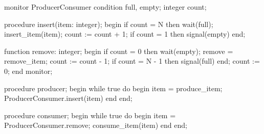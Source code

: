 \documentclass[varwidth=42em,crop]{standalone}
\begin{document}
\begin{minipage}[t]{.48\linewidth}
\begin{pascalcode}
monitor ProducerConsumer
  condition full, empty;
  integer count;

  procedure insert(item: integer);
  begin
    if count = N then wait(full);
    insert_item(item);
    count := count + 1;
    if count = 1 then signal(empty)
  end;
      
  function remove: integer;
  begin
    if count = 0 then wait(empty);
    remove = remove_item;
    count := count - 1;
    if count = N - 1 then signal(full)
  end;
  count := 0;
end monitor;  
\end{pascalcode}
\end{minipage}\qquad\quad
\begin{minipage}[t]{.48\linewidth}
\vspace{1em}
\begin{pascalcode}
procedure producer;
begin
  while true do
  begin
    item = produce_item;
    ProducerConsumer.insert(item)
  end
end;

procedure consumer;
begin
  while true do
  begin
    item = ProducerConsumer.remove;
    consume_item(item)
  end
end;  
\end{pascalcode}
\end{minipage}
\end{document}
